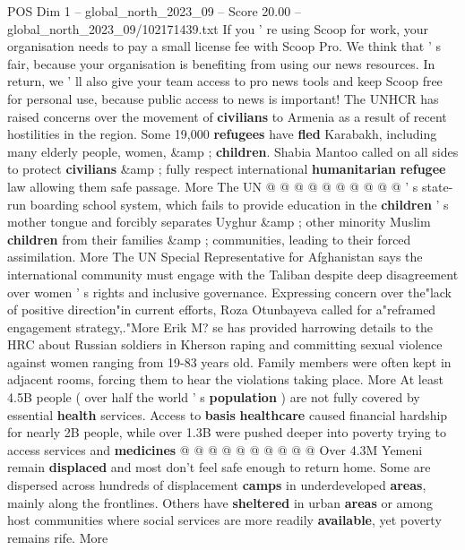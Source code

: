 \begin{textsample}{POS Dim 1 – global\_north\_2023\_09 – Score 20.00 – global\_north\_2023\_09/102171439.txt}
If you ' re using Scoop for work, your organisation needs to pay a small license fee with Scoop Pro.
We think that ' s fair, because your organisation is benefiting from using our news resources.
In return, we ' ll also give your team access to pro news tools and keep Scoop free for personal use, because public access to news is important!
The UNHCR has raised concerns over the movement of \textbf{civilians} to Armenia as a result of recent hostilities in the region.
Some 19,000 \textbf{refugees} have \textbf{fled} Karabakh, including many elderly people, women, \&amp ; \textbf{children}.
Shabia Mantoo called on all sides to protect \textbf{civilians} \&amp ; fully respect international \textbf{humanitarian} \textbf{refugee} law allowing them safe passage.
More The UN @ @ @ @ @ @ @ @ @ @ ' s state-run boarding school system, which fails to provide education in the \textbf{children} ' s mother tongue and forcibly separates Uyghur \&amp ; other minority Muslim \textbf{children} from their families \&amp ; communities, leading to their forced assimilation.
More The UN Special Representative for Afghanistan says the international community must engage with the Taliban despite deep disagreement over women ' s rights and inclusive governance.
Expressing concern over the"lack of positive direction"in current efforts, Roza Otunbayeva called for a"reframed engagement strategy,."More Erik M? se has provided harrowing details to the HRC about Russian soldiers in Kherson raping and committing sexual violence against women ranging from 19-83 years old.
Family members were often kept in adjacent rooms, forcing them to hear the violations taking place.
More At least 4.5B people ( over half the world ' s \textbf{population} ) are not fully covered by essential \textbf{health} services.
Access to \textbf{basis} \textbf{healthcare} caused financial hardship for nearly 2B people, while over 1.3B were pushed deeper into poverty trying to access services and \textbf{medicines} @ @ @ @ @ @ @ @ @ @ Over 4.3M Yemeni remain \textbf{displaced} and most don't feel safe enough to return home.
Some are dispersed across hundreds of displacement \textbf{camps} in underdeveloped \textbf{areas}, mainly along the frontlines.
Others have \textbf{sheltered} in urban \textbf{areas} or among host communities where social services are more readily \textbf{available}, yet poverty remains rife.
More

\end{textsample}
